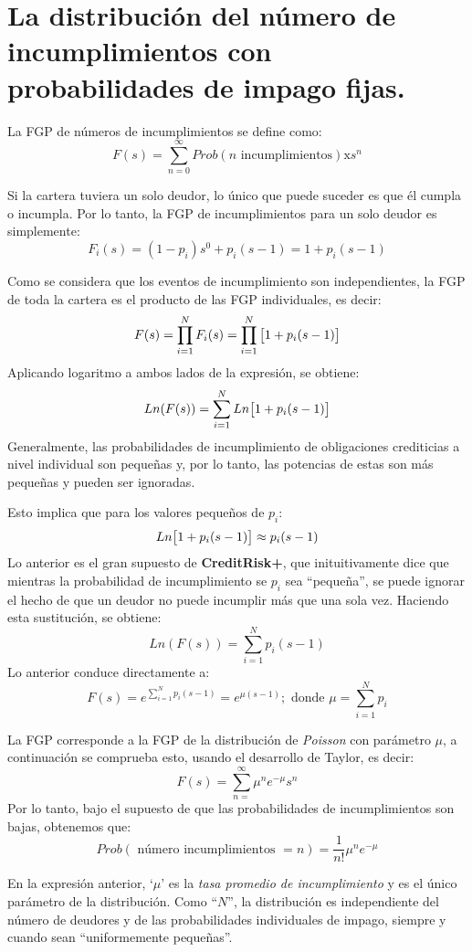 \documentclass[
  12pt,
]{krantz}
\theoremstyle{definition}
\theoremstyle{definition}
\theoremstyle{definition}
\theoremstyle{remark}
\begin{document}
\hypertarget{la-distribucion-del-numero-de-incumplimientos-con-probabilidades-de-impago-fijas.}{%
\section{La distribución del número de incumplimientos con probabilidades de impago fijas.}\label{la-distribucion-del-numero-de-incumplimientos-con-probabilidades-de-impago-fijas.}}

La FGP de números de incumplimientos se define como: \[F(s)=\sum_{n=0}^{\infty}Prob(n \textrm{ incumplimientos})\textrm{x}s^n\]

Si la cartera tuviera un solo deudor, lo único que puede suceder es que él cumpla o incumpla. Por lo tanto, la FGP de incumplimientos para un solo deudor es simplemente:\[F_i(s)=(1-p_i)s^0+p_i(s-1)=1+p_i(s-1)\]

Como se considera que los eventos de incumplimiento son independientes, la FGP de toda la cartera es el producto de las FGP individuales, es decir:\[F(s)=\prod_{i=1}^NF_i(s)=\prod_{i=1}^N\big{[}1+p_i(s-1)\big{]}\]
Aplicando logaritmo a ambos lados de la expresión, se obtiene:\[Ln(F(s))=\sum_{i=1}^NLn\big{[}1+p_i(s-1)\big{]}\]
Generalmente, las probabilidades de incumplimiento de obligaciones crediticias a nivel individual son pequeñas y, por lo tanto, las potencias de estas son más pequeñas y pueden ser ignoradas.

Esto implica que para los valores pequeños de \(p_i\):\[Ln\big{[}1+p_i(s-1)\big{]}\approx p_i(s-1)\]
Lo anterior es el gran supuesto de \textbf{CreditRisk+}, que inituitivamente dice que mientras la probabilidad de incumplimiento se \(p_i\) sea ``pequeña'', se puede ignorar el hecho de que un deudor no puede incumplir más que una sola vez. Haciendo esta sustitución, se obtiene:\[Ln(F(s))=\sum_{i=1}^Np_i(s-1)\]
Lo anterior conduce directamente a: \[F(s)=e^{\sum_{i=1}^Np_i(s-1)}=e^{\mu(s-1)};\textrm{ donde } \mu=\sum_{i=1}^Np_i\]

La FGP corresponde a la FGP de la distribución de \emph{Poisson} con parámetro \(\mu\), a continuación se comprueba esto, usando el desarrollo de Taylor, es decir:\[F(s)=\sum_{n=}^\infty\mu^ne^{-\mu}s^n\]
Por lo tanto, bajo el supuesto de que las probabilidades de incumplimientos son bajas, obtenemos que:\[Prob(\textrm{ número incumplimientos }=n)=\frac{1}{n!}\mu^ne^{-\mu}\]

En la expresión anterior, `\(\mu\)' es la \emph{tasa promedio de incumplimiento} y es el único parámetro de la distribución. Como ``\(N\)'', la distribución es independiente del número de deudores y de las probabilidades individuales de impago, siempre y cuando sean ``uniformemente pequeñas''.
\end{document}
